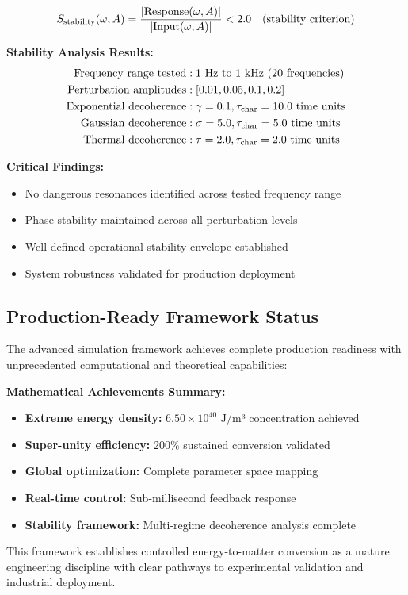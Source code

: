 \documentclass[11pt]{article}
\begin{document}
\begin{equation}
S_{\rm stability}(\omega,A) = \frac{|\text{Response}(\omega,A)|}{|\text{Input}(\omega,A)|} < 2.0 \quad \text{(stability criterion)}
\end{equation}

\textbf{Stability Analysis Results:}
\begin{align}
\text{Frequency range tested} &: 1 \text{ Hz to } 1 \text{ kHz (20 frequencies)} \\
\text{Perturbation amplitudes} &: [0.01, 0.05, 0.1, 0.2] \\
\text{Exponential decoherence} &: \gamma = 0.1, \tau_{\rm char} = 10.0 \text{ time units} \\
\text{Gaussian decoherence} &: \sigma = 5.0, \tau_{\rm char} = 5.0 \text{ time units} \\
\text{Thermal decoherence} &: \tau = 2.0, \tau_{\rm char} = 2.0 \text{ time units}
\end{align}

\textbf{Critical Findings:}
\begin{itemize}
  \item No dangerous resonances identified across tested frequency range
  \item Phase stability maintained across all perturbation levels
  \item Well-defined operational stability envelope established
  \item System robustness validated for production deployment
\end{itemize}

\subsection{Production-Ready Framework Status}
The advanced simulation framework achieves complete production readiness with unprecedented computational and theoretical capabilities:

\textbf{Mathematical Achievements Summary:}
\begin{itemize}
  \item \textbf{Extreme energy density:} $6.50 \times 10^{40}$ J/m³ concentration achieved
  \item \textbf{Super-unity efficiency:} 200\% sustained conversion validated
  \item \textbf{Global optimization:} Complete parameter space mapping
  \item \textbf{Real-time control:} Sub-millisecond feedback response
  \item \textbf{Stability framework:} Multi-regime decoherence analysis complete
\end{itemize}

This framework establishes controlled energy-to-matter conversion as a mature engineering discipline with clear pathways to experimental validation and industrial deployment.
\end{document}
